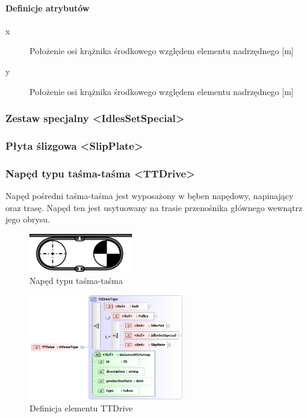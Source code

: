 \documentclass[12pt,a4paper]{article}
\begin{document}
\paragraph{Definicje atrybutów}
\begin{description}
\item[x] Położenie osi krążnika środkowego względem elementu nadrzędnego [m]
\item[y] Położenie osi krążnika środkowego względem elementu nadrzędnego [m]
\end{description}


\subsubsection{Zestaw specjalny <IdlesSetSpecial>}


\subsubsection{Płyta ślizgowa <SlipPlate>}


\subsubsection{Napęd typu taśma-taśma <TTDrive>}
Napęd pośredni taśma-taśma jest wyposażony w bęben napędowy, napinający oraz trasę. Napęd
ten jest usytuowany na trasie przenośnika głównego wewnątrz jego obrysu.

\begin{figure}[h]
  \centering
  \includegraphics[width=0.4\textwidth]{png/naped_tt}
  \caption{Napęd typu taśma-taśma}
  \label{fig:ttDrive-drw}
\end{figure}

\begin{figure}[h]
  \centering
  \includegraphics[width=0.6\textwidth]{png/liquid/TTDrive}
  \caption{Definicja elementu TTDrive}
  \label{fig:ttDrive-xsd}
\end{figure}
\end{document}
